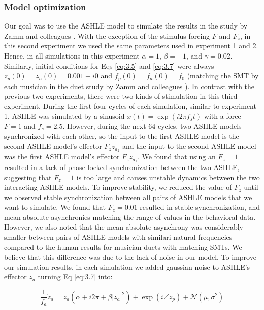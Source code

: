 \documentclass[10pt,letterpaper]{article}
\begin{document}
\subsubsection*{Model optimization}

Our goal was to use the ASHLE model to simulate the results in the study by Zamm and colleagues \cite{zamm2016endogenous}. With the exception of the stimulus forcing $F$ and $F_z$, in this second experiment we used the same parameters used in experiment 1 and 2. Hence, in all simulations in this experiment $\alpha = 1$, $\beta = −1$, and $\gamma = 0.02$. Similarly, initial conditions for Eqs \eqref{eq:3.5} and \eqref{eq:3.7} were always $z_p(0)=z_a(0)=0.001 + i0$ and $f_p(0)=f_a(0)=f_0$ (matching the SMT by each musician in the duet study by Zamm and colleagues \cite{zamm2016endogenous}). In contrast with the previous two experiments, there were two kinds of stimulation in this third experiment. During the first four cycles of each simulation, similar to experiment 1, ASHLE was simulated by a sinusoid $x(t)=\exp(i2\pi f_s t)$ with a force $F = 1$ and $f_s=2.5$. However, during the next 64 cycles, two ASHLE models synchronized with each other, so the input to the first ASHLE model is the second ASHLE model's effector $F_z z_{a_2}$ and the input to the second ASHLE model was the first ASHLE model's effector $F_z z_{a_1}$. We found that using an $F_z = 1$ resulted in a lack of phase-locked synchronization between the two ASHLE, suggesting that $F_z = 1$ is too large and causes unstable dynamics between the two interacting ASHLE models. To improve stability, we reduced the value of $F_z$ until we observed stable synchronization between all pairs of ASHLE models that we want to simulate. We found that $F_z = 0.01$ resulted in stable synchronization, and mean absolute asynchronies matching the range of values in the behavioral data. However, we also noted that the mean absolute asynchrony was considerably smaller between pairs of ASHLE models with similari natural frequencies compared to the human results for musician duets with matching SMTs. We believe that this difference was due to the lack of noise in our model. To improve our simulation results, in each simulation we added gaussian noise to ASHLE's effector $z_a$ turning Eq \eqref{eq:3.7} into:

\begin{equation}
\frac{1}{f_a}\dot{z}_a = z_a \left( \alpha + i2\pi + \beta|z_a|^2 \right) + \exp(i \angle z_p) + \mathcal{N}(\mu, \sigma^2) \label{eq:3.9}
\end{equation}
\end{document}
